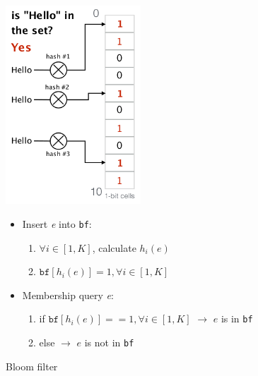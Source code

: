 \documentclass[11pt,oneside,a4paper]{article}
\begin{document}
\begin{figure}[hb]
	\begin{minipage}[t]{.5\textwidth} 
		\vspace{0pt}
		\centering 
		\includegraphics[width=0.45\textwidth]{figures/bloom_filter}
		\caption{Bloom filter \cite{advnet}}
		\label{fig:bloom_filter}
	\end{minipage} 
	\begin{minipage}[t]{.5\textwidth} 
		\vspace{10pt} 
		\begin{itemize}
			\setlength{\itemsep}{0pt}
			\setlength{\parskip}{0pt}
			\item Insert \textit{e} into \texttt{bf}: 
			\begin{enumerate}
				\item $\forall i \in [1,K]$, calculate $h_i(e)$
				\item $\texttt{bf}[h_i(e)] = 1, \forall i \in [1,K]$
			\end{enumerate}
			\item Membership query \textit{e}:
			\begin{enumerate}
				\item if $\texttt{bf}[h_i(e)] == 1, \forall i \in [1,K]$ 
				\newline $\rightarrow$ $e$ is in \texttt{bf}
				\item else 
				\newline $\rightarrow$ $e$ is not in \texttt{bf}
			\end{enumerate}
		\end{itemize}
	\end{minipage} 
\end{figure}
\end{document}
